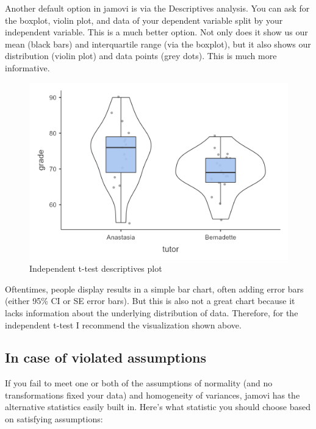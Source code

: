 \documentclass[
]{book}
\begin{document}
Another default option in jamovi is via the Descriptives analysis. You can ask for the boxplot, violin plot, and data of your dependent variable split by your independent variable. This is a much better option. Not only does it show us our mean (black bars) and interquartile range (via the boxplot), but it also shows our distribution (violin plot) and data points (grey dots). This is much more informative.

\begin{figure}

{\centering \includegraphics[width=1\linewidth]{images/02-independent_t-test/independent_t-test_plot} 

}

\caption{Independent t-test descriptives plot}\label{fig:unnamed-chunk-10}
\end{figure}

Oftentimes, people display results in a simple bar chart, often adding error bars (either 95\% CI or SE error bars). But this is also not a great chart because it lacks information about the underlying distribution of data. Therefore, for the independent t-test I recommend the visualization shown above.

\hypertarget{in-case-of-violated-assumptions-1}{%
\subsection{In case of violated assumptions}\label{in-case-of-violated-assumptions-1}}

If you fail to meet one or both of the assumptions of normality (and no transformations fixed your data) and homogeneity of variances, jamovi has the alternative statistics easily built in. Here's what statistic you should choose based on satisfying assumptions:
\end{document}
